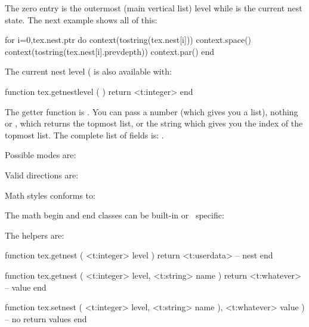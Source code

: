 The zero entry  is the outermost (main vertical list) level while
 is the current nest state. The next example shows
all of this:

\startbuffer
\setbox\scratchbox\vbox\bgroup
    \vbox\bgroup
        \startluacode
            for i=0,tex.nest.ptr do
                context(tostring(tex.nest[i]))
                context.space()
                context(tostring(tex.nest[i].prevdepth))
                context.par()
            end
        \stopluacode
    \egroup
\egroup
\stopbuffer

\typebuffer

\start \forgetall \getbuffer
\startlinecorrection
    \box\scratchbox
\stoplinecorrection
\stop

The current nest level ( is also available with:

\starttyping[option=LUA]
function tex.getnestlevel ( )
    return <t:integer>
end
\stoptyping

The getter function is . You can pass a number (which gives
you a list), nothing or , which returns the topmost list, or the
string  which gives you the index of the topmost list. The complete list
of fields is: .

Possible modes are:

\starttworows
{}
\stoptworows

Valid directions are:

\starttworows
{}
\stoptworows

Math styles conforms to:

\starttworows
{}
\stoptworows

The math begin and end classes can be built-in or \CONTEXT\ specific:

\startfourrows
{}
\stopfourrows

The helpers are:

\starttyping[option=LUA]
function tex.getnest ( <t:integer> level )
    return <t:userdata> -- nest
end

function tex.getnest ( <t:integer> level, <t:string> name )
    return <t:whatever> -- value
end

function tex.setnest ( <t:integer> level, <t:string> name ), <t:whatever> value )
    -- no return values
end
\stoptyping

